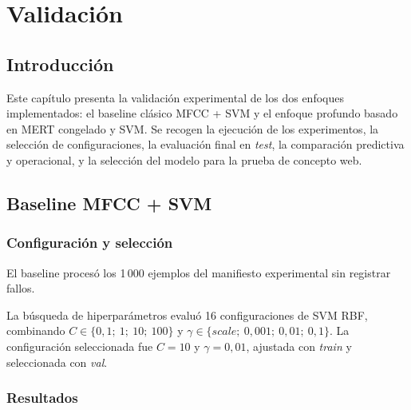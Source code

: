 \chapter{Validación}\label{cap:validacion}

\section{Introducción}

Este capítulo presenta la validación experimental de los dos enfoques implementados: el baseline clásico MFCC + SVM y el enfoque profundo basado en MERT congelado y SVM. Se recogen la ejecución de los experimentos, la selección de configuraciones, la evaluación final en \textit{test}, la comparación predictiva y operacional, y la selección del modelo para la prueba de concepto web.

\section{Baseline MFCC + SVM}

\subsection*{Configuración y selección}

El baseline procesó los 1\,000 ejemplos del manifiesto experimental sin registrar fallos.

La búsqueda de hiperparámetros evaluó 16 configuraciones de SVM RBF, combinando $C \in \{0{,}1;\ 1;\ 10;\ 100\}$ y $\gamma \in \{\textit{scale};\ 0{,}001;\ 0{,}01;\ 0{,}1\}$. La configuración seleccionada fue $C=10$ y $\gamma=0{,}01$, ajustada con \textit{train} y seleccionada con \textit{val}.

\subsection*{Resultados}

\begin{table}[H]
    \centering
    \caption{Medidas predictivas del baseline MFCC + SVM en \textit{val} y \textit{test}.}
    \label{tab:mfcc-svm-resultados}
\end{table}

